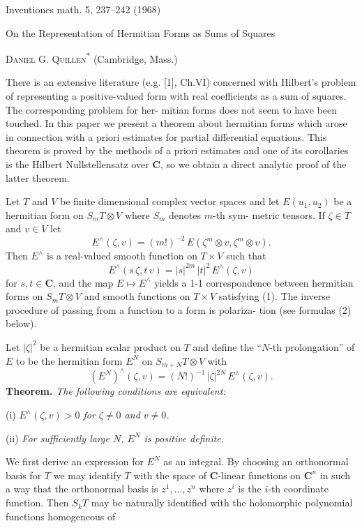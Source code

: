 
Inventiones math. 5, 237--242 (1968)

On the Representation of Hermitian Forms
as Sums of Squares

\textsc{Daniel G. Quillen}\textsuperscript{*} (Cambridge, Mass.)

There is an extensive literature (e.g. [1], Ch.VI) concerned with
Hilbert's problem of representing a positive-valued form with real
coefficients as a sum of squares. The corresponding problem for her-%
mitian forms does not seem to have been touched. In this paper we
present a theorem about hermitian forms which arose in connection
with a priori estimates for partial differential equations. This theorem is
proved by the methods of a priori estimates and one of its corollaries
is the Hilbert Nullstellensatz over $\mathbf{C}$, so we obtain a direct analytic proof
of the latter theorem.

Let $T$ and $V$ be finite dimensional complex vector spaces and let
$E(u_1,u_2)$ be a hermitian form on $S_m T\otimes V$ where $S_m$ denotes $m$-th sym-%
metric tensors. If $\zeta\in T$ and $v\in V$ let
\[ E^{\wedge}(\zeta,v)=(m!)^{-2}\,E(\zeta^m\otimes v,\zeta^m\otimes v). \]
Then $E^{\wedge}$ is a real-valued smooth function on $T\times V$ such that
\[ E^{\wedge}(s\,\zeta,t\,v)=|s|^{2m}\,|t|^2\,E^{\wedge}(\zeta,v) \tag{1} \]
for $s,t\in\mathbf{C}$, and the map $E\mapsto E^{\wedge}$ yields a 1-1 correspondence between
hermitian forms on $S_m T\otimes V$ and smooth functions on $T\times V$ satisfying (1).
The inverse procedure of passing from a function to a form is polariza-%
tion (see formulas (2) below).

Let $|\zeta|^2$ be a hermitian scalar product on $T$ and define the ``$N$-th
prolongation'' of $E$ to be the hermitian form $E^N$ on $S_{m+N}T\otimes V$ with
\[ (E^N)^{\wedge}(\zeta,v)=(N!)^{-1}\,|\zeta|^{2N}\,E^{\wedge}(\zeta,v). \]
\textbf{Theorem.} \emph{The following conditions are equivalent:}

(i) \emph{$E^{\wedge}(\zeta,v)>0$ for $\zeta\neq 0$ and $v\neq 0$.}

(ii) \emph{For sufficiently large $N$, $E^N$ is positive definite.}

We first derive an expression for $E^N$ as an integral. By choosing an
orthonormal basis for $T$ we may identify $T$ with the space of $\mathbf{C}$-linear
functions on $\mathbf{C}^n$ in such a way that the orthonormal basis is $z^1,\dots,z^n$
where $z^i$ is the $i$-th coordinate function. Then $S_k T$ may be naturally
identified with the holomorphic polynomial functions homogeneous of

